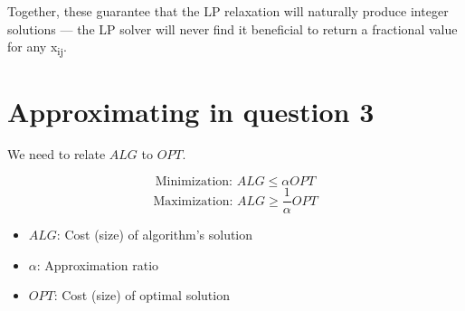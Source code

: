 \documentclass[11pt]{article}
\begin{document}
Together, these guarantee that the LP relaxation will naturally produce
integer solutions — the LP solver will never find it beneficial to return
a fractional value for any x\textsubscript{ij}.

\section{Approximating in question 3}
\label{sec:org01dfc1e}

We need to relate \(ALG\) to \(OPT\).

\[ \text{Minimization: } ALG \leq \alpha OPT \]
\[ \text{Maximization: } ALG \geq \frac{1}{\alpha} OPT \]

\begin{itemize}
\item \(ALG\): Cost (size) of algorithm's solution
\item \(\alpha\): Approximation ratio
\item \(OPT\): Cost (size) of optimal solution
\end{itemize}
\end{document}

